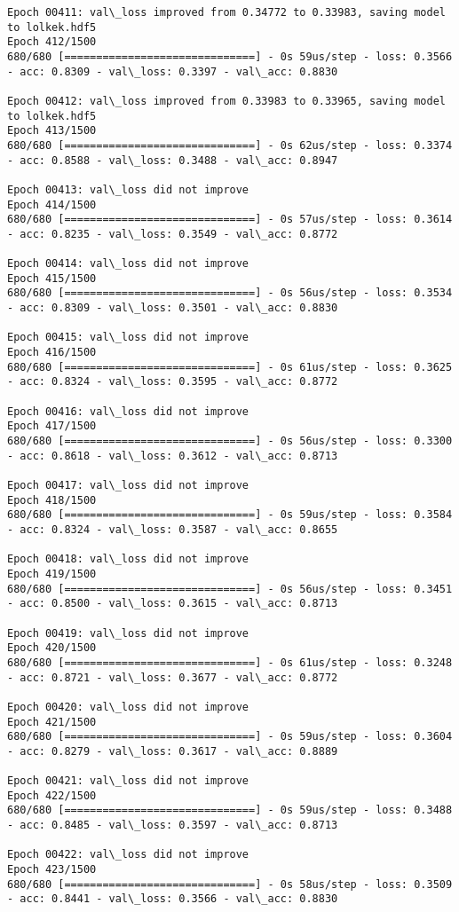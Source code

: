 \documentclass[11pt]{article}
\begin{document}
\begin{Verbatim}[commandchars=\\\{\}]
Epoch 00411: val\_loss improved from 0.34772 to 0.33983, saving model to lolkek.hdf5
Epoch 412/1500
680/680 [==============================] - 0s 59us/step - loss: 0.3566 - acc: 0.8309 - val\_loss: 0.3397 - val\_acc: 0.8830

Epoch 00412: val\_loss improved from 0.33983 to 0.33965, saving model to lolkek.hdf5
Epoch 413/1500
680/680 [==============================] - 0s 62us/step - loss: 0.3374 - acc: 0.8588 - val\_loss: 0.3488 - val\_acc: 0.8947

Epoch 00413: val\_loss did not improve
Epoch 414/1500
680/680 [==============================] - 0s 57us/step - loss: 0.3614 - acc: 0.8235 - val\_loss: 0.3549 - val\_acc: 0.8772

Epoch 00414: val\_loss did not improve
Epoch 415/1500
680/680 [==============================] - 0s 56us/step - loss: 0.3534 - acc: 0.8309 - val\_loss: 0.3501 - val\_acc: 0.8830

Epoch 00415: val\_loss did not improve
Epoch 416/1500
680/680 [==============================] - 0s 61us/step - loss: 0.3625 - acc: 0.8324 - val\_loss: 0.3595 - val\_acc: 0.8772

Epoch 00416: val\_loss did not improve
Epoch 417/1500
680/680 [==============================] - 0s 56us/step - loss: 0.3300 - acc: 0.8618 - val\_loss: 0.3612 - val\_acc: 0.8713

Epoch 00417: val\_loss did not improve
Epoch 418/1500
680/680 [==============================] - 0s 59us/step - loss: 0.3584 - acc: 0.8324 - val\_loss: 0.3587 - val\_acc: 0.8655

Epoch 00418: val\_loss did not improve
Epoch 419/1500
680/680 [==============================] - 0s 56us/step - loss: 0.3451 - acc: 0.8500 - val\_loss: 0.3615 - val\_acc: 0.8713

Epoch 00419: val\_loss did not improve
Epoch 420/1500
680/680 [==============================] - 0s 61us/step - loss: 0.3248 - acc: 0.8721 - val\_loss: 0.3677 - val\_acc: 0.8772

Epoch 00420: val\_loss did not improve
Epoch 421/1500
680/680 [==============================] - 0s 59us/step - loss: 0.3604 - acc: 0.8279 - val\_loss: 0.3617 - val\_acc: 0.8889

Epoch 00421: val\_loss did not improve
Epoch 422/1500
680/680 [==============================] - 0s 59us/step - loss: 0.3488 - acc: 0.8485 - val\_loss: 0.3597 - val\_acc: 0.8713

Epoch 00422: val\_loss did not improve
Epoch 423/1500
680/680 [==============================] - 0s 58us/step - loss: 0.3509 - acc: 0.8441 - val\_loss: 0.3566 - val\_acc: 0.8830


\end{Verbatim}
\end{document}
